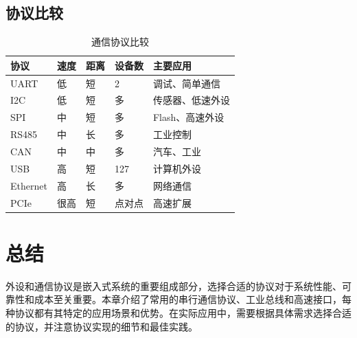 \subsection{协议比较}

\begin{table}[H]
  \centering
  \caption{通信协议比较}
  \begin{tabular}{|l|l|l|l|l|}
    \hline
    协议 & 速度 & 距离 & 设备数 & 主要应用 \\
    \hline
    UART & 低 & 短 & 2 & 调试、简单通信 \\
    I2C & 低 & 短 & 多 & 传感器、低速外设 \\
    SPI & 中 & 短 & 多 & Flash、高速外设 \\
    RS485 & 中 & 长 & 多 & 工业控制 \\
    CAN & 中 & 中 & 多 & 汽车、工业 \\
    USB & 高 & 短 & 127 & 计算机外设 \\
    Ethernet & 高 & 长 & 多 & 网络通信 \\
    PCIe & 很高 & 短 & 点对点 & 高速扩展 \\
    \hline
  \end{tabular}
\end{table}

\section{总结}

外设和通信协议是嵌入式系统的重要组成部分，选择合适的协议对于系统性能、可靠性和成本至关重要。本章介绍了常用的串行通信协议、工业总线和高速接口，每种协议都有其特定的应用场景和优势。在实际应用中，需要根据具体需求选择合适的协议，并注意协议实现的细节和最佳实践。

